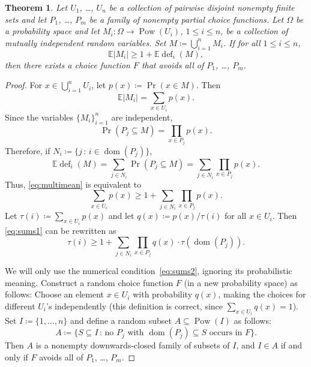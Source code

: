\documentclass[10pt]{article}
\numberwithin{equation}{subsection}
\newtheorem{theo}{Theorem}[section]
\theoremstyle{definition}
\newcommand{\powerset}[1]{\operatorname{Pow}(#1)}
\begin{document}
	\begin{theo}\label{theo:choice}
		Let $U_1$, \ldots, $U_n$ be a collection of pairwise disjoint nonempty finite sets and let $P_1$, \ldots, $P_m$ be a family of nonempty partial choice functions. Let $\Omega$ be a probability space and let $M_i \colon \Omega \to \powerset{U_i}$, $1 \leq i \leq n$, be a collection of mutually independent random variables. Set $M \coloneqq \bigcup_{i=1}^n M_i$. If for all $1 \leq i \leq n$,
		\begin{equation}\label{eq:multimean}
		\mathbb{E}|M_i| \geq 1 + \mathbb{E} \operatorname{def}_i(M),
		\end{equation}
		then there exists a choice function $F$ that avoids all of $P_1$, \ldots, $P_m$.
	\end{theo}
	\begin{proof}
		For $x \in \bigcup_{i=1}^n U_i$, let $p(x) \coloneqq \Pr(x \in M)$. Then
		$$
		\mathbb{E} |M_i| = \sum_{x \in U_i} p(x).
		$$
		Since the variables $\{M_i\}_{i=1}^n$ are independent,
		$$
		\Pr(P_j \subseteq M) = \prod_{x \in P_j} p(x).
		$$
		Therefore, if $N_i \coloneqq \{j \,:\, i \in \operatorname{dom}(P_j)\}$,
		$$
		\mathbb{E}\operatorname{def}_i(M) = \sum_{j \in N_i} \Pr(P_j \subseteq M) = \sum_{j \in N_i} \prod_{x \in P_j} p(x).
		$$
		Thus, \eqref{eq:multimean} is equivalent to
		\begin{equation}\label{eq:sums1}
		\sum_{x \in U_i} p(x) \geq 1 + \sum_{j \in N_i} \prod_{x \in P_j} p(x).
		\end{equation}
		Let $\tau(i) \coloneqq \sum_{x \in U_i} p(x)$ and let $q(x) \coloneqq p(x)/\tau(i)$ for all $x \in U_i$. Then \eqref{eq:sums1} can be rewritten as
		\begin{equation}\label{eq:sums2}
		\tau(i) \geq 1 + \sum_{j \in N_i} \prod_{x \in P_j} q(x) \cdot \tau(\operatorname{dom}(P_j)) .
		\end{equation}
		
		We will only use the numerical condition~\eqref{eq:sums2}, ignoring its probabilistic meaning. Construct a random choice function $F$ (in a new probability space) as follows: Choose an element $x \in U_i$ with probability $q(x)$, making the choices for different $U_i$'s independently (this definition is correct, since $\sum_{x \in U_i} q(x) = 1$). Set $I \coloneqq \{1, \ldots, n\}$ and define a random subset $A\subseteq \powerset{I}$ as follows:
		$$
			A \coloneqq \{S \subseteq I \,:\, \text{no $P_j$ with $\operatorname{dom}(P_j) \subseteq S$ occurs in $F$}\}.
		$$
		Then $A$ is a nonempty downwards-closed family of subsets of $I$, and $I \in A$ if and only if $F$ avoids all of $P_1$, \ldots, $P_m$.
		

\end{proof}
\end{document}
